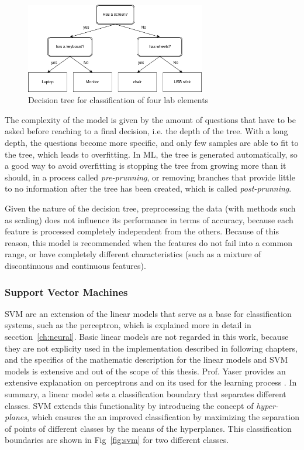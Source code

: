 \begin{figure}[!htb]
    \centering
      \includegraphics[width=0.7\textwidth]{figures/dt_example}
      \caption{Decision tree for classification of four lab elements}
      \label{fig:dt_example}
\end{figure}

The complexity of the model is given by the amount of questions that have to be asked before reaching to a final decision, i.e. the depth of the tree. With a long depth, the questions become more specific, and only few samples are able to fit to the tree, which leads to overfitting. In \ac{ML}, the tree is generated automatically, so a good way to avoid overfitting is stopping the tree from growing more than it should, in a process called \emph{pre-prunning}, or removing branches that provide little to no information after the tree has been created, which is called \emph{post-prunning}.

Given the nature of the decision tree, preprocessing the data (with methods such as scaling) does not influence its performance in terms of accuracy, because each feature is processed completely independent from the others. Because of this reason, this model is recommended when the features do not fail into a common range, or have completely different characteristics (such as a mixture of discontinuous and continuous features).

\subsubsection{Support Vector Machines}
\ac{SVM} are an extension of the linear models that serve as a base for classification systems, such as the perceptron, which is explained more in detail in secction~\ref{ch:neural}. Basic linear models are not regarded in this work, because they are not explicity used in the implementation described in following chapters, and the specifics of the mathematic description for the linear models and \ac{SVM} models is extensive and out of the scope of this thesis. Prof. Yaser provides an extensive explanation on perceptrons and on its used for the learning process \cite{Yaser}. In summary, a linear model sets a classification boundary that separates different classes. \ac{SVM} extends this functionality by introducing the concept of \emph{hyper-planes}, which ensures the an improved classification by maximizing the separation of points of different classes by the means of the hyperplanes. This classification boundaries are shown in Fig~\ref{fig:svm} for two different classes.

